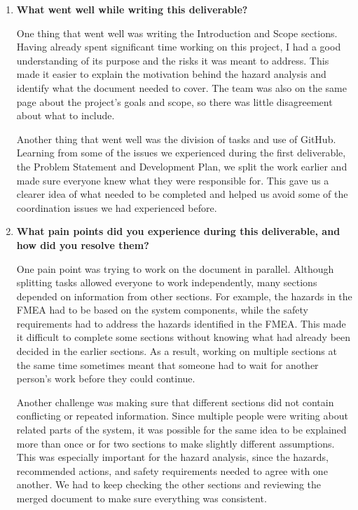 \documentclass{article}
\newcounter{hazard}
\begin{document}
\begin{enumerate}
    \item \textbf{What went well while writing this deliverable?}
    
    One thing that went well was writing the Introduction and
    Scope sections. Having already spent significant time working
    on this project, I had a good understanding of its purpose
    and the risks it was meant to address. This made it easier
    to explain the motivation behind the hazard analysis and
    identify what the document needed to cover. The team was
    also on the same page about the project's goals and scope,
    so there was little disagreement about what to include.

    Another thing that went well was the division of tasks and
    use of GitHub. Learning from some of the issues we experienced
    during the first deliverable, the Problem Statement and
    Development Plan, we split the work earlier and made sure
    everyone knew what they were responsible for. This gave us
    a clearer idea of what needed to be completed and helped us
    avoid some of the coordination issues we had experienced
    before.

    \item \textbf{What pain points did you experience during this deliverable,
    and how did you resolve them?}

    One pain point was trying to work on the document in parallel.
    Although splitting tasks allowed everyone to work independently,
    many sections depended on information from other sections.
    For example, the hazards in the FMEA had to be based on the
    system components, while the safety requirements had to address
    the hazards identified in the FMEA. This made it difficult to
    complete some sections without knowing what had already been
    decided in the earlier sections. As a result, working on
    multiple sections at the same time sometimes meant that
    someone had to wait for another person's work before they
    could continue.

    Another challenge was making sure that different sections
    did not contain conflicting or repeated information. Since
    multiple people were writing about related parts of the
    system, it was possible for the same idea to be explained
    more than once or for two sections to make slightly different
    assumptions. This was especially important for the hazard
    analysis, since the hazards, recommended actions, and safety
    requirements needed to agree with one another. We had to
    keep checking the other sections and reviewing the merged
    document to make sure everything was consistent.


\end{enumerate}
\end{document}
